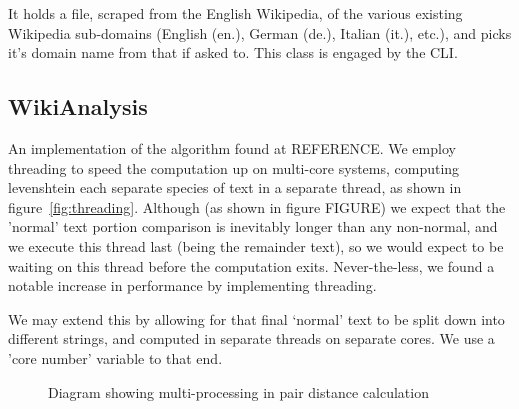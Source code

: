 It holds a file, scraped from the English Wikipedia, of the various
existing Wikipedia sub-domains (English (en.), German (de.), Italian
(it.), etc.), and picks it's domain name from that if asked to. This
class is engaged by the CLI.

\subsection*{WikiAnalysis}
An implementation of the algorithm found at REFERENCE. We employ
threading to speed the computation up on multi-core systems, computing
levenshtein each separate species of text in a separate thread, as
shown in figure~\ref{fig:threading}. Although (as shown in figure
FIGURE) we expect that the 'normal' text portion comparison is
inevitably longer than any non-normal, and we execute this thread last
(being the remainder text), so we would expect to be waiting on this
thread before the computation exits. Never-the-less, we found a
notable increase in performance by implementing threading.

We may extend this by allowing for that final `normal' text to be
split down into different strings, and computed in separate threads on
separate cores. We use a 'core number' variable to that end.

\begin{figure}
  \centering
  \caption{Diagram showing multi-processing in pair distance calculation}
\end{figure}
